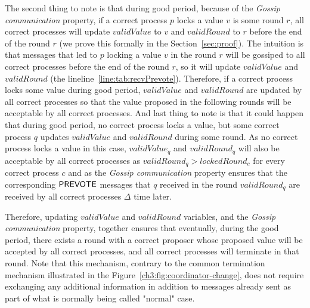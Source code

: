 The second thing to note is that during good period, because of the
\emph{Gossip communication} property, if a correct process $p$ locks a value
$v$ is some round $r$, all correct processes will update $validValue$ to $v$
and $validRound$ to $r$ before the end of the round $r$ (we prove this formally
in the Section~\ref{sec:proof}). The intuition is that messages that led to $p$
locking a value $v$ in the round $r$ will be gossiped to all correct processes
before the end of the round $r$, so it will update $validValue$ and
$validRound$ (the lineline~\ref{line:tab:recvPrevote}). Therefore, if a correct
process locks some value during good period, $validValue$ and $validRound$ are
updated by all correct processes so that the value proposed in the following
rounds will be acceptable by all correct processes. And last thing to note is
that it could happen that during good period, no correct process locks a value,
but some correct process $q$ updates $validValue$ and $validRound$ during some
round. As no correct process locks a value in this case, $validValue_q$ and
$validRound_q$ will also be acceptable by all correct processes as
$validRound_q > lockedRound_c$ for every correct process $c$ and as the
\emph{Gossip communication} property ensures that the corresponding $\mathsf{PREVOTE}$
messages that $q$ received in the round $validRound_q$ are received by all
correct processes $\Delta$ time later. 

Therefore, updating $validValue$ and $validRound$ variables, and the
\emph{Gossip communication} property, together ensures that eventually, during
the good period, there exists a round with a correct proposer whose proposed
value will be accepted by all correct processes, and all correct processes will
terminate in that round. Note that this mechanism, contrary to the common
termination mechanism illustrated in the
Figure~\ref{ch3:fig:coordinator-change}, does not require exchanging any
additional information in addition to messages already sent as part of what is
normally being called "normal" case.     
